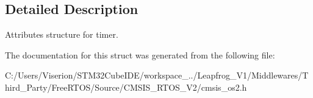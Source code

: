 \subsection{Detailed Description}
Attributes structure for timer. 

The documentation for this struct was generated from the following file\+:\begin{DoxyCompactItemize}
\item 
C\+:/\+Users/\+Viserion/\+S\+T\+M32\+Cube\+I\+D\+E/workspace\+\_../\+Leapfrog\+\_\+\+V1/\+Middlewares/\+Third\+\_\+\+Party/\+Free\+R\+T\+O\+S/\+Source/\+C\+M\+S\+I\+S\+\_\+\+R\+T\+O\+S\+\_\+\+V2/cmsis\+\_\+os2.\+h\end{DoxyCompactItemize}

